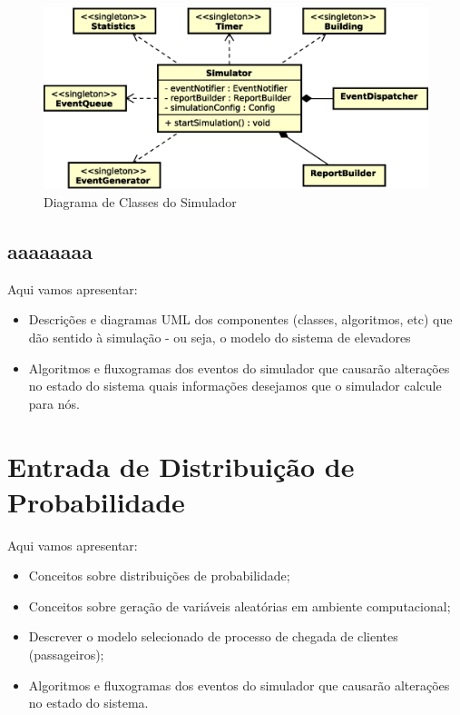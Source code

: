 \begin{figure}[htb!]
  \centering
  \includegraphics[scale=0.6]{img/Simulator.eps}
  \caption{Diagrama de Classes do Simulador}
\label{fig:diagram:simulator}
\end{figure}

\subsection{aaaaaaaa}

Aqui vamos apresentar:

\begin{itemize}
  \item Descrições e diagramas UML dos componentes (classes, algoritmos, etc)
que dão sentido à simulação - ou seja, o modelo do sistema de elevadores
  \item Algoritmos e fluxogramas dos eventos do simulador que causarão
alterações no estado do sistema quais informações desejamos que o simulador
calcule para nós.
\end{itemize}

\section{\label{chap:input}Entrada de Distribuição de Probabilidade}

Aqui vamos apresentar:

\begin{itemize}
\item Conceitos sobre distribuições de probabilidade;
\item Conceitos sobre geração de variáveis aleatórias em ambiente computacional;
\item Descrever o modelo selecionado de processo de chegada de clientes
(passageiros);
\item Algoritmos e fluxogramas dos eventos do simulador que causarão alterações
no estado do sistema.
\end{itemize}